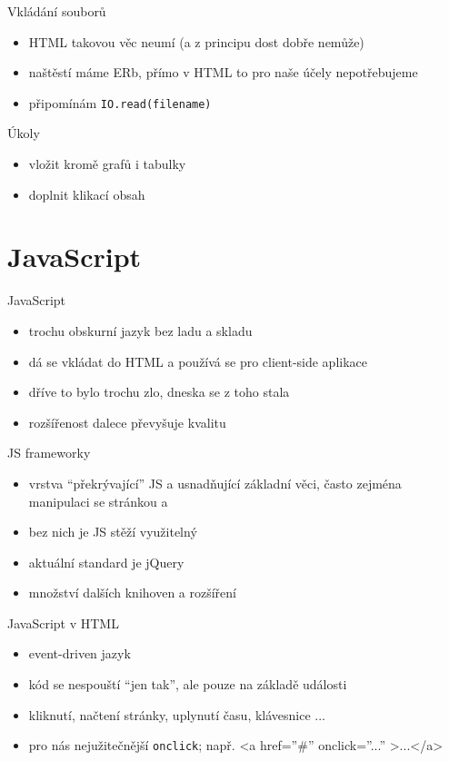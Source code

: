 \documentclass{beamer}
\begin{document}
\begin{frame}[fragile]{Vkládání souborů}
  \begin{itemize}
    \item HTML takovou věc neumí (a z principu dost dobře nemůže)
    \item naštěstí máme ERb, přímo v HTML to pro naše účely nepotřebujeme
    \item připomínám \texttt{IO.read(filename)}
  \end{itemize}
\end{frame}

\begin{frame}{Úkoly}
  \begin{itemize}
    \item vložit kromě grafů i tabulky
    \item doplnit klikací obsah
  \end{itemize}
\end{frame}


\section{JavaScript}

\begin{frame}{JavaScript}
  \begin{itemize}
    \item trochu obskurní jazyk bez ladu a skladu
    \item dá se vkládat do HTML a používá se pro client-side aplikace
    \item dříve to bylo trochu zlo, dneska se z toho stala
    \item rozšířenost dalece převyšuje kvalitu
  \end{itemize}
\end{frame}

\begin{frame}{JS frameworky}
  \begin{itemize}
    \item vrstva ``překrývající'' JS a usnadňující základní věci, často zejména manipulaci se stránkou a
    \item bez nich je JS stěží využitelný
    \item aktuální standard je jQuery
    \item množství dalších knihoven a rozšíření
  \end{itemize}
\end{frame}

\begin{frame}{JavaScript v HTML}
  \begin{itemize}
    \item event-driven jazyk
    \item kód se nespouští ``jen tak'', ale pouze na základě události
    \item kliknutí, načtení stránky, uplynutí času, klávesnice ...
    \item pro nás nejužitečnější \texttt{onclick}; např. <a href=''\#'' onclick=''...'' >...</a>
  \end{itemize}
\end{frame}
\end{document}
